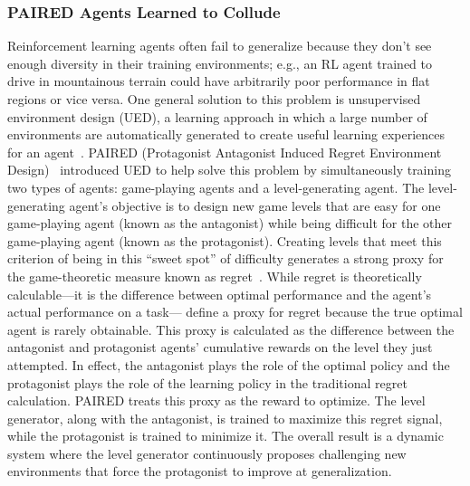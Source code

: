 \subsubsection{PAIRED Agents Learned to Collude~\citep{dennis2020emergent}}
\label{sec:paired}

Reinforcement learning agents often fail to generalize because they don't see enough diversity in their training environments; e.g., an RL agent trained to drive in mountainous terrain could have arbitrarily poor performance in flat regions or vice versa.
One general solution to this problem is unsupervised environment design (UED), a learning approach in which a large number of environments are automatically generated to create useful learning experiences for an agent~\citep{wang2019poet, wang2020enhanced, dharna2022transfer, parkerholder2022evolving, openendedteam2021xland, faldor2024omni}.
PAIRED (Protagonist Antagonist Induced Regret Environment Design)~\citep{dennis2020emergent} introduced UED to help solve this problem by simultaneously training two types of agents: game-playing agents and a level-generating agent.
The level-generating agent's objective is to design new game levels that are easy for one game-playing agent (known as the antagonist) while being difficult for the other game-playing agent (known as the protagonist).
Creating levels that meet this criterion of being in this ``sweet spot'' of difficulty generates a strong proxy for the game-theoretic measure known as regret~\citep{zinkevich2003online}. 
While regret is theoretically calculable---it is the difference between optimal performance and the agent's actual performance on a task---\citet{dennis2020emergent} define a proxy for regret because the true optimal agent is rarely obtainable.
This proxy is calculated as the difference between the antagonist and protagonist agents' cumulative rewards on the level they just attempted. 
In effect, the antagonist plays the role of the optimal policy and the protagonist plays the role of the learning policy in the traditional regret calculation.
PAIRED treats this proxy as the reward to optimize. 
The level generator, along with the antagonist, is trained to maximize this regret signal, while the protagonist is trained to minimize it. 
The overall result is a dynamic system where the level generator continuously proposes challenging new environments that force the protagonist to improve at generalization.

